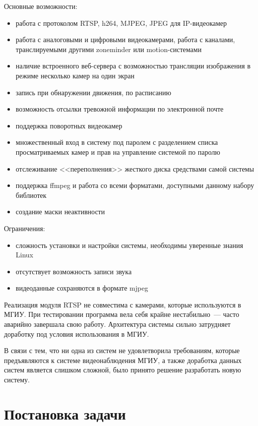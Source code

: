 Основные возможности:
\smallskip
\begin{itemize}
	\item
	работа с протоколом RTSP, h264, MJPEG, JPEG для IP-видеокамер
	\item
	работа с аналоговыми и цифровыми видеокамерами, работа с каналами,
	транслируемыми другими zoneminder или motion-системами
	\item
	наличие встроенного веб-сервера с возможностью трансляции изображения
	в режиме несколько камер на один экран
	\item
	запись при обнаружении движения, по расписанию
	\item
	возможность отсылки тревожной информации по электронной почте
	\item
	поддержка поворотных видеокамер
	\item
	множественный вход в систему под паролем с разделением списка просматриваемых камер
	и прав на управление системой по паролю
	\item
	отслеживание <<переполнения>> жесткого диска средствами самой системы
	\item
	поддержка ffmpeg и работа со всеми форматами, доступными данному набору библиотек
	\item
	создание маски неактивности
\end{itemize}

\medskip

Ограничения:
\smallskip
\begin{itemize}
	\item сложность установки и настройки системы, необходимы уверенные знания Linux
	\item отсутствует возможность записи звука
	\item видеоданные сохраняются в формате mjpeg
\end{itemize}

\medskip

Реализация модуля RTSP не совместима с камерами, которые используются в МГИУ. При тестировании
программа вела себя крайне нестабильно~--- часто аварийно завершала свою работу.
Архитектура системы сильно затрудняет доработку под условия использования в МГИУ.

\medskip

В связи с тем, что ни одна из систем не удовлетворила требованиям, которые предъявляются к системе
видеонаблюдения МГИУ, а также доработка данных систем является слишком сложной, было принято
решение разработать новую систему.


\section{Постановка задачи}


